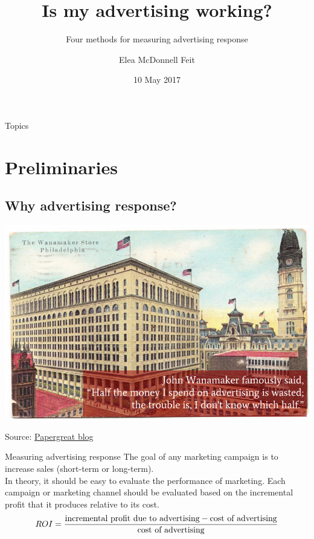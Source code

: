 \documentclass[10pt, aspectratio=169]{beamer}
\title{Is my advertising working?}
\subtitle{Four methods for measuring advertising response}
\date{10 May 2017} %
\author{Elea McDonnell Feit}
\newcommand{\source}[1]{\begin{flushright} \footnotesize Source: {#1} \end{flushright} \normalsize}
\begin{document}
{

}

\maketitle

\begin{frame}{Topics}
\tableofcontents[hideallsubsections]
\end{frame}


\section{Preliminaries}

\subsection{Why advertising response?}

\begin{frame}{}
\centering
\includegraphics[height=\textheight]{images/WanamakerQuote.png}
\source{\href{http://www.papergreat.com/2012/09/saturdays-postcard-wanamakers-and-1911.html}{Papergreat blog}}
\end{frame}

\begin{frame}{Measuring advertising response}
The goal of any marketing campaign is to increase sales (short-term or long-term). \\
\bigskip \pause
In theory, it should be easy to evaluate the performance of marketing.  Each campaign or marketing channel should be evaluated based on the \alert{incremental profit} that it produces relative to its \alert{cost}. \\
\bigskip
\begin{equation*}
ROI = \frac{\textnormal{incremental profit due to advertising} - \textnormal{cost of advertising}}{\textnormal{cost of advertising}}
\end{equation*}
\end{frame}
\end{document}
